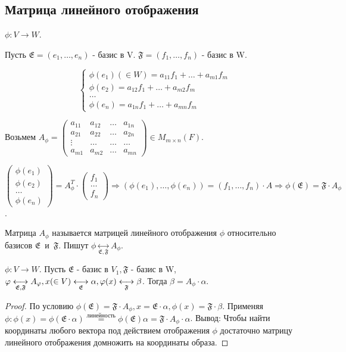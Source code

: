 \subsection{Матрица линейного отображения}
\begin{definition}
	\(\phi: V\to W\).
	
	Пусть \(\mathfrak{E} = (e_1, \ldots, e_n)\) - базис в V. \(\mathfrak{F} = (f_1,\ldots, f_n)\) - базис в W. 
	
	\[\begin{cases*}
		\phi(e_1)(\in W) = a_{11}f_1 + \ldots + a_{m1}f_m \\
		\phi(e_2) = a_{12}f_1+\ldots+a_{m2}f_m\\
		\ldots \\
		\phi(e_n) = a_{1n}f_1 + \ldots + a_{mn}f_m 
	\end{cases*}\]
	
	Возьмем \(A_\phi = \begin{pmatrix}
		a_{11} & a_{12} & \ldots & a_{1n}\\
		a_{21} & a_{22} & \ldots & a_{2n}\\
		\vdots & \ldots & \ldots & \ldots\\
		a_{m1} & a_{m2} & \ldots & a_{mn}
	\end{pmatrix}\in M_{m\times n}(F)\). 
	
	\(\begin{pmatrix}
		\phi(e_1) \\ 
		\phi(e_2) \\ 
		\ldots \\
		 \phi(e_n)
	\end{pmatrix} = A_\phi^T\cdot\begin{pmatrix}
	f_1 \\ \ldots \\ f_n
	\end{pmatrix}\Longrightarrow (\phi(e_1), \ldots, \phi(e_n)) = (f_1, \ldots, f_n)\cdot A\Longrightarrow \phi(\mathfrak{E}) = \mathfrak{F}\cdot A_\phi\). 
	
	Матрица \(A_\phi\) называется матрицей линейного отображения $\phi$ относительно базисов \(\mathfrak{E}\)~и~\(\mathfrak{F}\). Пишут \(\phi\underset{\mathfrak{E}, \mathfrak{F}}{\longleftrightarrow}A_\phi\).
\end{definition}
\begin{proposition}
	\(\phi:V\to W\). Пусть \(\mathfrak{E}\) - базис в \(V_1, \mathfrak{F}\) - базис в W, \(\phi\underset{\mathfrak{E}, \mathfrak{F}}{\longleftrightarrow}A_\phi, \\ x(\in V)\underset{\mathfrak{E}}{\longleftrightarrow}\alpha, \phi(x)\underset{\mathfrak{F}}{\longleftrightarrow}\beta\). Тогда \(\beta = A_\phi\cdot\alpha\).
\end{proposition}
\begin{proof}
	По условию \(\phi(\mathfrak{E}) = \mathfrak{F}\cdot A_\phi, x = \mathfrak{E}\cdot\alpha, \phi(x) = \mathfrak{F}\cdot\beta\). Применяя $\phi: \phi(x) = \phi(\mathfrak{E}\cdot\alpha) \overset{\text{линейность}}{=} \phi(\mathfrak{E})\alpha = \mathfrak{F}\cdot A_\phi\cdot\alpha$. Вывод: Чтобы найти координаты любого вектора под действием отображения $\phi$ достаточно матрицу линейного отображения домножить на координаты образа.
\end{proof}


